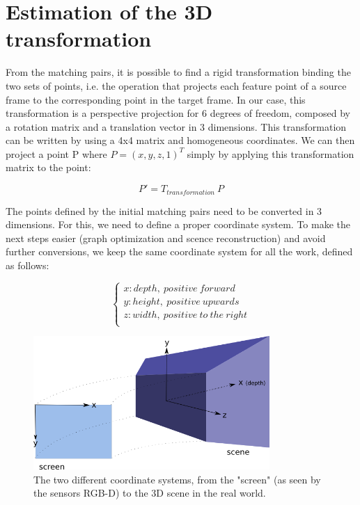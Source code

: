 \section{Estimation of the 3D transformation}
\label{sec:transformation}

From the matching pairs, it is possible to find a rigid transformation binding the two sets of points, i.e. the operation that projects each feature point of a source frame to the corresponding point in the target frame. In our case, this transformation is a perspective projection for 6 degrees of freedom, composed by a rotation matrix and a translation vector in 3 dimensions. This transformation can be written by using a 4x4  matrix and homogeneous coordinates. We can then project a point P where $P = (x,y,z,1)^T$ simply by applying this transformation matrix to the point:

\[
P' = T_{transformation} \: P
\]

The points defined by the initial matching pairs need to be converted in 3 dimensions. For this, we need to define a proper coordinate system. To make the next steps easier (graph optimization and scence reconstruction) and avoid further conversions, we keep the same coordinate system for all the work, defined as follows:

\[
\left\{\begin{array}{l}
x: depth,\:positive\:forward\\
y: height,\:positive\:upwards\\
z: width,\:positive\:to\:the\:right\\
\end{array}
\right.
\]

\begin{figure}[H]
\centering
\includegraphics[width=0.8\textwidth]{figures/coordinates}
\caption{The two different coordinate systems, from the "screen" (as seen by the sensors RGB-D) to the 3D scene in the real world.}
\end{figure}

